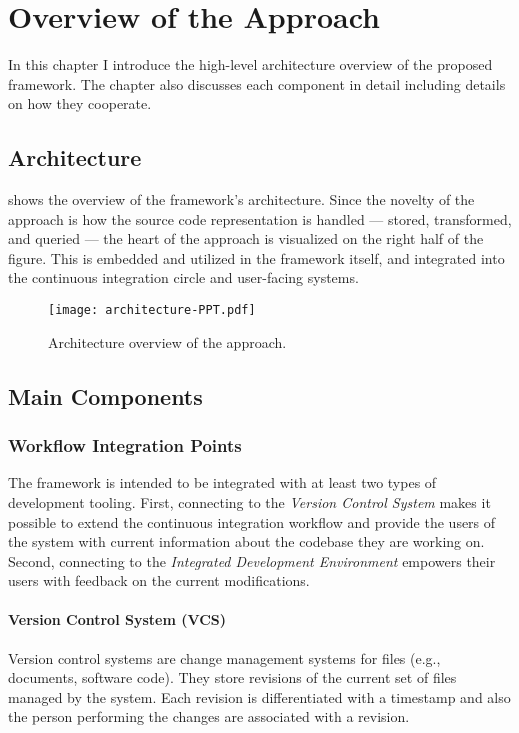 \chapter{Overview of the Approach}
\label{chap:overview-of-the-approach}

In this chapter I introduce the high-level architecture overview of the proposed framework. The chapter also discusses each component in detail including details on how they cooperate.

\section{Architecture}
\label{sect:architecture}
 shows the overview of the framework's architecture. Since the novelty of the approach is how the source code representation is handled --- stored, transformed, and queried --- the heart of the approach is visualized on the right half of the figure. This is embedded and utilized in the framework itself, and integrated into the continuous integration circle and user-facing systems.

\begin{figure}[!htb]
  \centering
  \texttt{[image: architecture-PPT.pdf]}
  \caption{Architecture overview of the approach.}
  \label{fig:architecture-overview}
\end{figure}


\section{Main Components}

\subsection{Workflow Integration Points}
The framework is intended to be integrated with at least two types of development tooling. First, connecting to the \emph{Version Control System} makes it possible to extend the continuous integration workflow and provide the users of the system with current information about the codebase they are working on. Second, connecting to the \emph{Integrated Development Environment} empowers their users with feedback on the current modifications.

\subsubsection{Version Control System (VCS)}
Version control systems are change management systems for files (e.g., documents, software code). They store revisions of the current set of files managed by the system. Each revision is differentiated with a timestamp and also the person performing the changes are associated with a revision.

